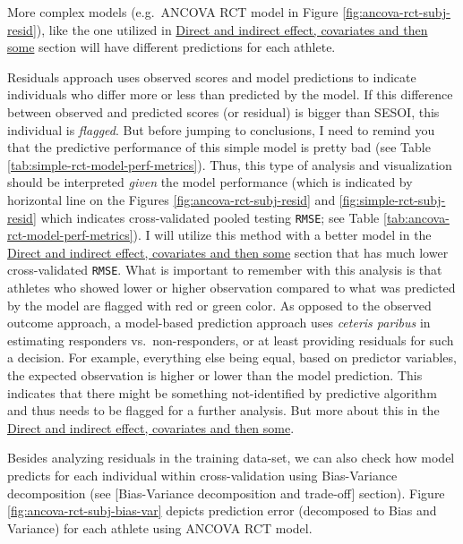 \documentclass[
]{book}
\begin{document}
More complex models (e.g.~ANCOVA RCT model in Figure \ref{fig:ancova-rct-subj-resid}), like the one utilized in \protect\hyperlink{direct-and-indirect-effect-covariates-and-then-some}{Direct and indirect effect, covariates and then some} section will have different predictions for each athlete.

Residuals approach uses observed scores and model predictions to indicate individuals who differ more or less than predicted by the model. If this difference between observed and predicted scores (or residual) is bigger than SESOI, this individual is \emph{flagged}. But before jumping to conclusions, I need to remind you that the predictive performance of this simple model is pretty bad (see Table \ref{tab:simple-rct-model-perf-metrics}). Thus, this type of analysis and visualization should be interpreted \emph{given} the model performance (which is indicated by horizontal line on the Figures \ref{fig:ancova-rct-subj-resid} and \ref{fig:simple-rct-subj-resid} which indicates cross-validated pooled testing \texttt{RMSE}; see Table \ref{tab:ancova-rct-model-perf-metrics}). I will utilize this method with a better model in the \protect\hyperlink{direct-and-indirect-effect-covariates-and-then-some}{Direct and indirect effect, covariates and then some} section that has much lower cross-validated \texttt{RMSE}. What is important to remember with this analysis is that athletes who showed lower or higher observation compared to what was predicted by the model are flagged with red or green color. As opposed to the observed outcome approach, a model-based prediction approach uses \emph{ceteris paribus} in estimating responders vs.~non-responders, or at least providing residuals for such a decision. For example, everything else being equal, based on predictor variables, the expected observation is higher or lower than the model prediction. This indicates that there might be something not-identified by predictive algorithm and thus needs to be flagged for a further analysis. But more about this in the \protect\hyperlink{direct-and-indirect-effect-covariates-and-then-some}{Direct and indirect effect, covariates and then some}.

Besides analyzing residuals in the training data-set, we can also check how model predicts for each individual within cross-validation using Bias-Variance decomposition (see {[}Bias-Variance decomposition and trade-off{]} section). Figure \ref{fig:ancova-rct-subj-bias-var} depicts prediction error (decomposed to Bias and Variance) for each athlete using ANCOVA RCT model.
\end{document}
